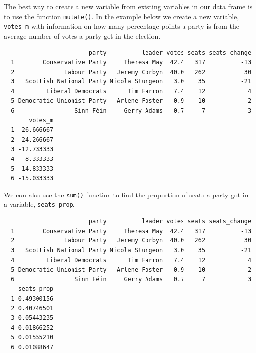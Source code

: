 \documentclass[12pt,oneside]{reedthesis}
\theoremstyle{definition}
\theoremstyle{definition}
\theoremstyle{definition}
\theoremstyle{remark}
\begin{document}
  The best way to create a new variable from existing variables in our
  data frame is to use the function \texttt{mutate()}. In the example
  below we create a new variable, \texttt{votes\_m} with information on
  how many percentage points a party is from the average number of votes a
  party got in the election.
  \begin{Shaded}
  \begin{Highlighting}[]
  \OperatorTok{-}\StringTok{ }
  \end{Highlighting}
  \end{Shaded}
  \begin{verbatim}
                        party          leader votes seats seats_change
  1        Conservative Party     Theresa May  42.4   317          -13
  2              Labour Party   Jeremy Corbyn  40.0   262           30
  3   Scottish National Party Nicola Sturgeon   3.0    35          -21
  4         Liberal Democrats      Tim Farron   7.4    12            4
  5 Democratic Unionist Party   Arlene Foster   0.9    10            2
  6                 Sinn Féin     Gerry Adams   0.7     7            3
       votes_m
  1  26.666667
  2  24.266667
  3 -12.733333
  4  -8.333333
  5 -14.833333
  6 -15.033333
  \end{verbatim}
  We can also use the \texttt{sum()} function to find the proportion of
  seats a party got in a variable, \texttt{seats\_prop}.
  \begin{Shaded}
  \begin{Highlighting}[]
  \OperatorTok{/}\StringTok{ }
  \end{Highlighting}
  \end{Shaded}
  \begin{verbatim}
                        party          leader votes seats seats_change
  1        Conservative Party     Theresa May  42.4   317          -13
  2              Labour Party   Jeremy Corbyn  40.0   262           30
  3   Scottish National Party Nicola Sturgeon   3.0    35          -21
  4         Liberal Democrats      Tim Farron   7.4    12            4
  5 Democratic Unionist Party   Arlene Foster   0.9    10            2
  6                 Sinn Féin     Gerry Adams   0.7     7            3
    seats_prop
  1 0.49300156
  2 0.40746501
  3 0.05443235
  4 0.01866252
  5 0.01555210
  6 0.01088647
  \end{verbatim}
\end{document}
